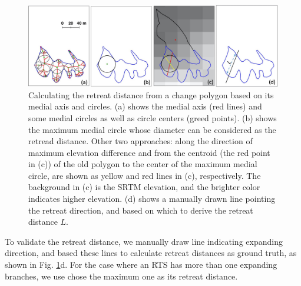 \documentclass[authoryear,preprint,review,12pt]{elsarticle}
\begin{document}
\begin{figure} 
	\centering
	\includegraphics[width=14cm]{figs/retreat_distance_trim.jpg}
	\caption{Calculating the retreat distance from a change polygon based on its medial axis and circles. (a) shows the medial axis (red lines) and some medial circles as well as circle centers (greed points). (b) shows the maximum medial circle whose diameter can be considered as the retread distance. Other two approaches: along the direction of maximum elevation difference and from the centroid (the red point in (c)) of the old polygon to the center of the maximum medial circle, are shown as yellow and red lines in (c), respectively. The background in (c) is the SRTM elevation, and the brighter color indicates higher elevation. (d) shows a manually drawn line pointing the retreat direction, and based on which to derive the retreat distance $L$. }
	\label{fig_retreat_dis}
\end{figure}





To validate the retreat distance, we manually draw line indicating expanding direction, and based these lines to calculate retreat distances as ground truth, as shown in Fig. \ref{fig_retreat_dis}d. 
For the case where an RTS has more than one expanding branches, we use chose the maximum one as its retreat distance. 
\end{document}
